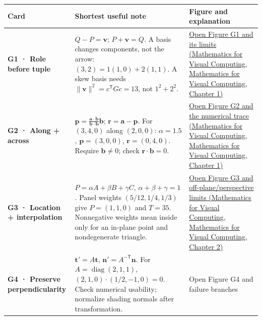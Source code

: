 {\def\LTcaptype{none} %
\begin{longtable}[]{@{}
  >{\raggedright\arraybackslash}p{}
  >{\raggedright\arraybackslash}p{}
  >{\raggedright\arraybackslash}p{}@{}}
\toprule\noalign{}
\begin{minipage}[b]{\linewidth}\raggedright
Card
\end{minipage} & \begin{minipage}[b]{\linewidth}\raggedright
Shortest useful note
\end{minipage} & \begin{minipage}[b]{\linewidth}\raggedright
Figure and explanation
\end{minipage} \\
\midrule\noalign{}
\endhead
\bottomrule\noalign{}
\endlastfoot
\textbf{G1 · Role before tuple} & \(Q-P=\mathbf v\); \(P+\mathbf v=Q\). A basis changes components, not the arrow: \((3,2)=1(1,0)+2(1,1)\). A skew basis needs \(\|\mathbf v\|^2=c^\mathsf TGc=13\), not \(1^2+2^2\). & \href{../02-Mathematics-for-Visual-Computing/main.pdf\#nameddest=01-foundations-i-ch017-g1---one-movement-two-descriptions}{Open Figure G1 and its limits (Mathematics for Visual Computing, Mathematics for Visual Computing, Chapter 1)} \\
\textbf{G2 · Along + across} & \(\mathbf p=\frac{\mathbf a\cdot\mathbf b}{\mathbf b\cdot\mathbf b}\mathbf b\); \(\mathbf r=\mathbf a-\mathbf p\). For \((3,4,0)\) along \((2,0,0)\): \(\alpha=1.5\), \(\mathbf p=(3,0,0)\), \(\mathbf r=(0,4,0)\). Require \(\mathbf b\ne0\); check \(\mathbf r\cdot\mathbf b=0\). & \href{../02-Mathematics-for-Visual-Computing/main.pdf\#nameddest=01-foundations-i-ch017-g2---split-the-request-into-rail-travel-and-sideways-travel}{Open Figure G2 and the numerical trace (Mathematics for Visual Computing, Mathematics for Visual Computing, Chapter 1)} \\
\textbf{G3 · Location + interpolation} & \(P=\alpha A+\beta B+\gamma C\), \(\alpha+\beta+\gamma=1\). Panel weights \((5/12,1/4,1/3)\) give \(P=(1,1,0)\) and \(T=35\). Nonnegative weights mean inside only for an in-plane point and nondegenerate triangle. & \href{../02-Mathematics-for-Visual-Computing/main.pdf\#nameddest=01-foundations-i-ch018-g3---reconstruct-a-sensor-location-from-the-corners}{Open Figure G3 and off-plane/perspective limits (Mathematics for Visual Computing, Mathematics for Visual Computing, Chapter 2)} \\
\textbf{G4 · Preserve perpendicularity} & \(\mathbf t'=A\mathbf t\), \(\mathbf n'=A^{-\mathsf T}\mathbf n\). For \(A=\operatorname{diag}(2,1,1)\), \((2,1,0)\cdot(1/2,-1,0)=0\). Check numerical usability; normalize shading normals after transformation. & {Open Figure G4 and failure branches} \\
\end{longtable}
}

